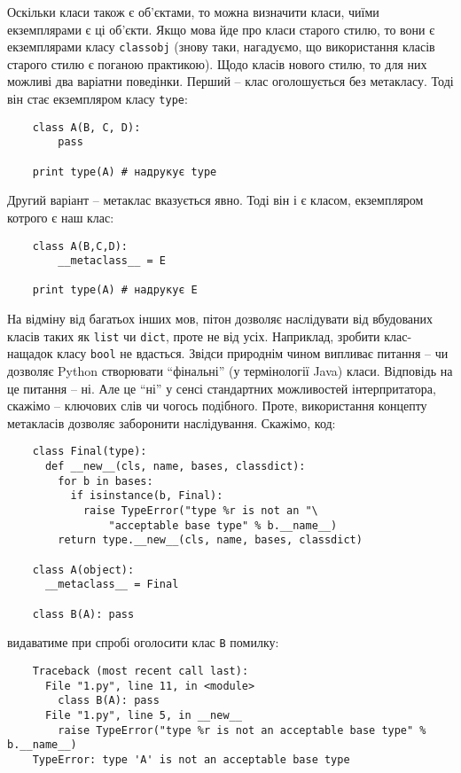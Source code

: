 \documentclass[a4paper, 12pt, onsedie]{article}
\begin{document}
    Оскільки класи також є об'єктами, то можна визначити класи, чиїми екземплярами є ці об'єкти.
    Якщо мова йде про класи старого стилю, то вони є екземплярами класу \texttt{classobj} (знову
    таки, нагадуємо, що використання класів старого стилю є поганою практикою). Щодо класів 
    нового стилю, то для них можливі два варіатни поведінки. Перший -- клас оголошується без 
    метакласу. Тоді він стає екземпляром класу \texttt{type}:
    \begin{verbatim}
    class A(B, C, D):
        pass

    print type(A) # надрукує type
    \end{verbatim}
    Другий варіант -- метаклас вказується явно. Тоді він і є класом, екземпляром котрого є наш
    клас:
    \begin{verbatim}
    class A(B,C,D):
        __metaclass__ = E

    print type(A) # надрукує E
    \end{verbatim}

    На відміну від багатьох інших мов, пітон дозволяє наслідувати від вбудованих класів таких 
    як \texttt{list} чи \texttt{dict}, проте не від усіх. Наприклад, зробити клас-нащадок класу
    \texttt{bool} не вдасться. Звідси природнім чином випливає питання -- чи дозволяє Python
    створювати ``фінальні'' (у термінології Java) класи. Відповідь на це питання -- ні. Але це
    ``ні'' у сенсі стандартних можливостей інтерпритатора, скажімо -- ключових слів чи чогось
    подібного. Проте, використання концепту метакласів дозволяє заборонити наслідування.
    Скажімо, код:

    \begin{verbatim}
    class Final(type):
      def __new__(cls, name, bases, classdict):
        for b in bases:
          if isinstance(b, Final):
            raise TypeError("type %r is not an "\
                "acceptable base type" % b.__name__)
        return type.__new__(cls, name, bases, classdict)

    class A(object):
      __metaclass__ = Final

    class B(A): pass
    \end{verbatim}
    видаватиме при спробі оголосити клас \texttt{B} помилку:

    \begin{verbatim}
    Traceback (most recent call last):
      File "1.py", line 11, in <module>
        class B(A): pass
      File "1.py", line 5, in __new__
        raise TypeError("type %r is not an acceptable base type" % b.__name__)
    TypeError: type 'A' is not an acceptable base type
    \end{verbatim}
\end{document}
